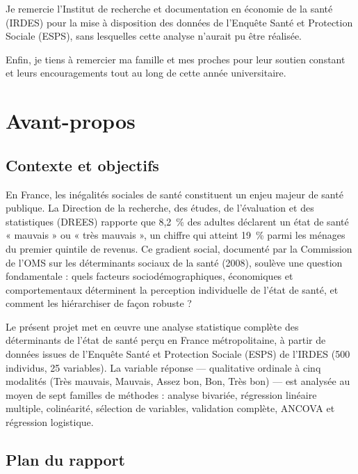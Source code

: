\documentclass[11pt,a4paper]{memoirerecherche}
\begin{document}
Je remercie l'Institut de recherche et documentation en économie de la santé (IRDES) pour la mise à disposition des données de l'Enquête Santé et Protection Sociale (ESPS), sans lesquelles cette analyse n'aurait pu être réalisée.

Enfin, je tiens à remercier ma famille et mes proches pour leur soutien constant et leurs encouragements tout au long de cette année universitaire.

\newpage

\hypertarget{avant-propos}{%
\section*{Avant-propos}\label{avant-propos}}

\hypertarget{contexte-et-objectifs}{%
\subsection*{Contexte et objectifs}\label{contexte-et-objectifs}}

En France, les inégalités sociales de santé constituent un enjeu majeur de santé publique. La Direction de la recherche, des études, de l'évaluation et des statistiques (DREES) rapporte que 8,2~\% des adultes déclarent un état de santé « mauvais » ou « très mauvais », un chiffre qui atteint 19~\% parmi les ménages du premier quintile de revenus. Ce gradient social, documenté par la Commission de l'OMS sur les déterminants sociaux de la santé (2008), soulève une question fondamentale : quels facteurs sociodémographiques, économiques et comportementaux déterminent la perception individuelle de l'état de santé, et comment les hiérarchiser de façon robuste ?

Le présent projet met en œuvre une analyse statistique complète des déterminants de l'état de santé perçu en France métropolitaine, à partir de données issues de l'Enquête Santé et Protection Sociale (ESPS) de l'IRDES (500 individus, 25 variables). La variable réponse --- qualitative ordinale à cinq modalités (Très mauvais, Mauvais, Assez bon, Bon, Très bon) --- est analysée au moyen de sept familles de méthodes : analyse bivariée, régression linéaire multiple, colinéarité, sélection de variables, validation complète, ANCOVA et régression logistique.

\hypertarget{plan-du-rapport}{%
\subsection*{Plan du rapport}\label{plan-du-rapport}}
\end{document}
